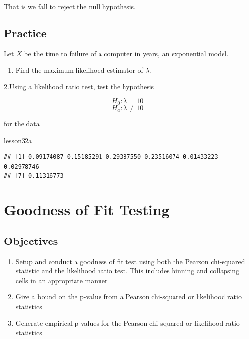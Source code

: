 \documentclass[]{book}
\newenvironment{Shaded}{\begin{snugshade}}{\end{snugshade}}
\newcommand{\NormalTok}[1]{#1}
\providecommand{\tightlist}{%
  \setlength{\itemsep}{0pt}\setlength{\parskip}{0pt}}
\theoremstyle{definition}
\theoremstyle{definition}
\theoremstyle{definition}
\theoremstyle{remark}
\begin{document}
That is we fall to reject the null hypothesis.

\subsection{Practice}\label{practice-11}

Let \(X\) be the time to failure of a computer in years, an exponential
model.

\begin{enumerate}
\def\labelenumi{\arabic{enumi}.}
\tightlist
\item
  Find the maximum likelihood estimator of \(\lambda\).
\end{enumerate}

2.Using a likelihood ratio test, test the hypothesis

\[H_{0}: \lambda = 10\] \[H_{a}: \lambda \neq 10\]

for the data

\begin{Shaded}
\begin{Highlighting}[]
\NormalTok{lesson32a}
\end{Highlighting}
\end{Shaded}

\begin{verbatim}
## [1] 0.09174087 0.15185291 0.29387550 0.23516074 0.01433223 0.02978746
## [7] 0.11316773
\end{verbatim}

\hypertarget{L27}{\section{Goodness of Fit Testing}\label{L27}}

\subsection{Objectives}\label{objectives-25}

\begin{enumerate}
\def\labelenumi{\arabic{enumi}.}
\tightlist
\item
  Setup and conduct a goodness of fit test using both the Pearson
  chi-squared statistic and the likelihood ratio test. This includes
  binning and collapsing cells in an appropriate manner\\
\item
  Give a bound on the p-value from a Pearson chi-squared or likelihood
  ratio statistics\\
\item
  Generate empirical p-values for the Pearson chi-squared or likelihood
  ratio statistics
\end{enumerate}
\end{document}
